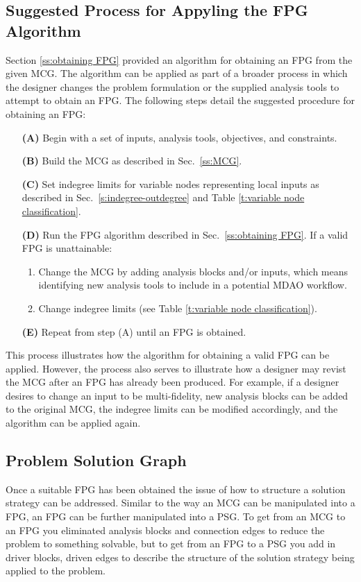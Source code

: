 \subsection{Suggested Process for Appyling the FPG Algorithm}
\label{ss:process}
Section \ref{ss:obtaining FPG} provided an algorithm for obtaining an FPG from the given MCG. 
The algorithm can be applied as part of a broader process in which the designer changes the problem formulation or the supplied analysis tools to attempt to obtain an FPG. The following steps detail the suggested procedure for obtaining an FPG:
\begin{enumerate}
\item[\bf{(A)}] Begin with a set of inputs, analysis tools, objectives, and constraints.
\item[\bf{(B)}] Build the MCG as described in Sec.~\ref{ss:MCG}.
\item[\bf{(C)}] Set indegree limits for variable nodes representing local inputs as described in Sec.~\ref{s:indegree-outdegree} and Table \ref{t:variable node classification}.
\item[\bf{(D)}] Run the FPG algorithm described in Sec.~\ref{ss:obtaining FPG}. If a valid FPG is unattainable:
		\begin{enumerate}
\item Change the MCG by adding analysis blocks and/or inputs, which means identifying new analysis tools to include in a potential MDAO workflow.
\item Change indegree limits (see Table \ref{t:variable node classification}).
\end{enumerate}
\item[\bf{(E)}] Repeat from step (A) until an FPG is obtained.
\end{enumerate}
This process illustrates how the algorithm for obtaining a valid FPG can be applied. However, the process also serves to illustrate how a designer may revist the MCG after an FPG has already been produced. For example, if a designer desires to change an input to be multi-fidelity, new analysis blocks can be added to the original MCG, the indegree limits can be modified accordingly, and the algorithm can be applied again.



\subsection{Problem Solution Graph}
Once a suitable FPG has been obtained the issue of how to structure a solution strategy 
can be addressed. Similar to the way an MCG can be manipulated into a FPG, an FPG can be
further manipulated into a PSG. To get from an MCG to an FPG you eliminated analysis blocks and
connection edges to reduce the problem to something solvable, but to get from an FPG to a PSG you 
add in driver blocks, driven edges to describe the structure of the solution strategy being applied 
to the problem.  